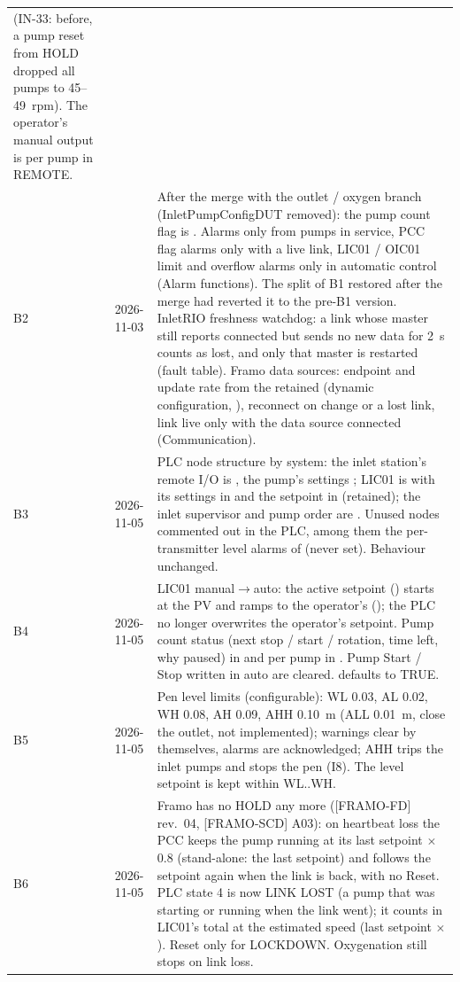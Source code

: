 \documentclass[11pt,a4paper]{article}
\begin{document}
\begin{small}
\begin{tabularx}{\textwidth}{@{}P{10mm}P{22mm}L@{}}
   (IN-33: before, a pump reset from HOLD dropped all pumps to 45--49~rpm). The
  operator's manual output is per pump in REMOTE. \\
B2 & 2026-11-03 & After the merge with the outlet / oxygen branch (InletPumpConfigDUT removed): the pump
  count flag is . Alarms only from pumps in service, PCC flag alarms
  only with a live link, LIC01 / OIC01 limit and overflow alarms only in automatic control (Alarm
  functions). The split  of B1 restored after the merge had reverted it to the
  pre-B1 version. InletRIO freshness watchdog: a link whose master still reports connected but sends
  no new data for 2~s counts as lost, and only that master is restarted (fault table). Framo data sources:
  endpoint and update rate from the retained  (dynamic configuration, ),
  reconnect on change or a lost link, link live only with the data source connected (Communication). \\
\bottomrule
B3 & 2026-11-05 & PLC node structure by system: the inlet station's remote I/O is , the pump's settings ; LIC01 is  with its settings in  and the setpoint in  (retained); the inlet supervisor and pump order are . Unused nodes commented out in the PLC, among them the per-transmitter level alarms of  (never set). Behaviour unchanged. \\
B4 & 2026-11-05 & LIC01 manual$\to$auto: the active setpoint () starts at the PV and ramps to the operator's  (); the PLC no longer overwrites the operator's setpoint. Pump count status (next stop / start / rotation, time left, why paused) in  and per pump in . Pump Start / Stop written in auto are cleared.  defaults to TRUE. \\
B5 & 2026-11-05 & Pen level limits (configurable): WL 0.03, AL 0.02, WH 0.08, AH 0.09, AHH 0.10~m (ALL 0.01~m, close the outlet, not implemented); warnings clear by themselves, alarms are acknowledged; AHH trips the inlet pumps and stops the pen (I8). The level setpoint is kept within WL..WH. \\
B6 & 2026-11-05 & Framo has no HOLD any more ([FRAMO-FD] rev.~04, [FRAMO-SCD] A03): on heartbeat loss the PCC keeps the pump running at its last setpoint $\times$ 0.8 (stand-alone: the last setpoint) and follows the setpoint again when the link is back, with no Reset. PLC state 4 is now LINK LOST (a pump that was starting or running when the link went); it counts in LIC01's total at the estimated speed (last setpoint $\times$ ). Reset only for LOCKDOWN. Oxygenation still stops on link loss. \\

\end{tabularx}
\end{small}
\end{document}
